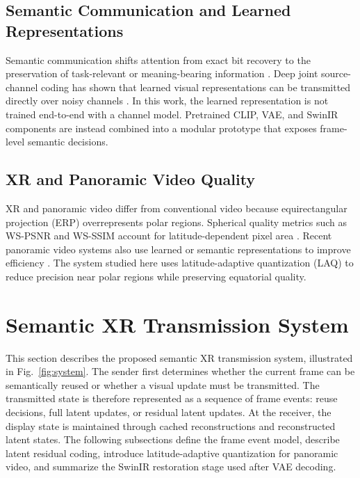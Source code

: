 \documentclass[conference]{IEEEtran}
\begin{document}
\subsection{Semantic Communication and Learned Representations}

Semantic communication shifts attention from exact bit recovery to the preservation of task-relevant or meaning-bearing information \cite{shannon1948mathematical,weaver1949mathematics,xie2021semantic,qin2021semantic}. Deep joint source-channel coding has shown that learned visual representations can be transmitted directly over noisy channels \cite{bourtsoulatze2019deep}. In this work, the learned representation is not trained end-to-end with a channel model. Pretrained CLIP, VAE, and SwinIR components are instead combined into a modular prototype that exposes frame-level semantic decisions.

\subsection{XR and Panoramic Video Quality}

XR and panoramic video differ from conventional video because equirectangular projection (ERP) overrepresents polar regions. Spherical quality metrics such as WS-PSNR and WS-SSIM account for latitude-dependent pixel area \cite{sun2017wspsnr}. Recent panoramic video systems also use learned or semantic representations to improve efficiency \cite{gao2024panoramic,gao2025clesc}. The system studied here uses latitude-adaptive quantization (LAQ) to reduce precision near polar regions while preserving equatorial quality.


\section{Semantic XR Transmission System}

This section describes the proposed semantic XR transmission system, illustrated in Fig.~\ref{fig:system}. The sender first determines whether the current frame can be semantically reused or whether a visual update must be transmitted. The transmitted state is therefore represented as a sequence of frame events: reuse decisions, full latent updates, or residual latent updates. At the receiver, the display state is maintained through cached reconstructions and reconstructed latent states. The following subsections define the frame event model, describe latent residual coding, introduce latitude-adaptive quantization for panoramic video, and summarize the SwinIR restoration stage used after VAE decoding.
\end{document}
